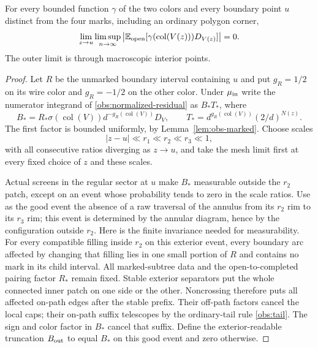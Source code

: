 \begin{lemma}
\label{lem:obs-boundary-residual}
For every bounded function $\gamma$ of the two colors and every
boundary point $u$ distinct from the four marks, including an
ordinary polygon corner,
\begin{equation}
 \lim_{z\to u}\limsup_{n\to\infty}
 \left|\mathbb E_{\rm open}
       [\gamma(\operatorname{col}(V(z)))D_{V(z)}]\right|=0.
 \label{obs:boundary-residual}
\end{equation}
The outer limit is through macroscopic interior points.
\end{lemma}

\begin{proof}
Let $R$ be the unmarked boundary interval containing $u$ and put
$g_R=1/2$ on its wire color and $g_R=-1/2$ on the other color.
Under $\mu_{\rm in}$ write the numerator integrand of
\eqref{obs:normalized-residual} as $B_*T_*$, where
\begin{equation}
 B_*=R_*\sigma(\operatorname{col}(V))
               d^{-g_R(\operatorname{col}(V))}D_V,
 \qquad
 T_*=d^{g_R(\operatorname{col}(V))}(2/d)^{N(z)}.
 \label{obs:BT}
\end{equation}
The first factor is bounded uniformly, by Lemma~\ref{lem:obs-marked}.
Choose scales
\begin{equation}
 |z-u|\ll r_1\ll r_2\ll r_3\ll1,
 \label{obs:boundary-scales}
\end{equation}
with all consecutive ratios diverging as $z\to u$, and take the
mesh limit first at every fixed choice of $z$ and these scales.

Actual screens in the regular sector at $u$ make $B_*$ measurable
outside the $r_2$ patch, except on an event whose probability tends
to zero in the scale ratios.  Use as the good event the absence of
a raw traversal of the annulus from its $r_2$ rim to its $r_3$ rim;
this event is determined by the annular diagram, hence by the
configuration outside $r_2$.  Here is the finite invariance needed
for measurability.  For every compatible filling inside $r_2$ on
this exterior event, every boundary arc affected by changing that
filling lies in one small portion of $R$ and contains no
mark in its child interval.  All marked-subtree data and the
open-to-completed pairing factor $R_*$ remain fixed.  Stable exterior
separators put the whole connected inner patch on one side or the
other.  Noncrossing therefore puts all affected on-path edges after
the stable prefix.  Their off-path factors cancel the local caps;
their on-path suffix telescopes by the ordinary-tail rule
\eqref{obs:tail}.  The sign and color factor in $B_*$ cancel
that suffix.  Define the exterior-readable truncation $B_{\rm out}$
to equal $B_*$ on this good event and zero otherwise.


\end{proof}
